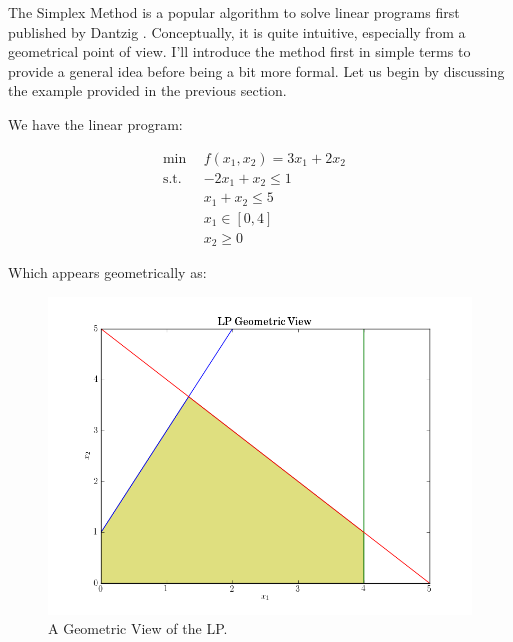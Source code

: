 The Simplex Method is a popular algorithm to solve linear programs first
published by Dantzig \cite{dantzig_maximization_1951}. Conceptually, it is quite
intuitive, especially from a geometrical point of view. I'll introduce the
method first in simple terms to provide a general idea before being a bit more
formal. Let us begin by discussing the example provided in the previous section.

We have the linear program:

\begin{subequations}\label{eqs:lp}
  \begin{align}
    \min \:\: & 
    f(x_1, x_2) = 3 x_1 + 2 x_2
    & \label{eqs:lp_obj} \\
    \text{s.t.} \:\: &
    -2 x_1 + x_2 \leq 1 \\
    &
    x_1 + x_2 \leq 5 
    & \label{eqs:lp_sup} \\
    &
    x_1 \in [0, 4]
    &\label{eqs:lp_x1} \\
    &
    x_2 \geq 0
    &\label{eqs:lp_x2}
  \end{align}
\end{subequations}
 
Which appears geometrically as:

\begin{figure}[H]
  \begin{center}
    \includegraphics[width=\linewidth]{./chapters/litreview/plots/geometric.png}
  \caption{A Geometric View of the LP.}
  \label{fig:geometric}
  \end{center}
\end{figure}

